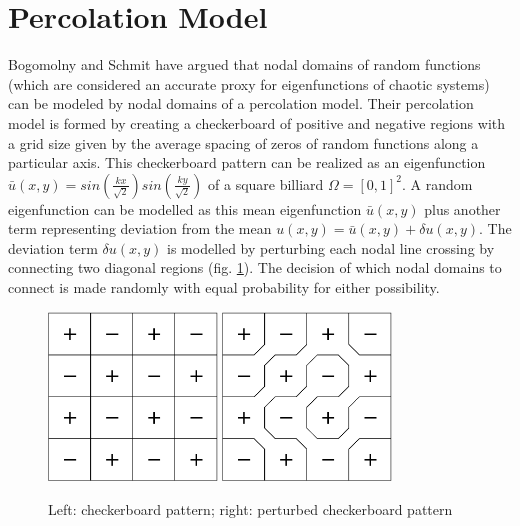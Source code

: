 \documentclass{report}
\begin{document}
\section{Percolation Model}
\label{sec:percolation}
Bogomolny and Schmit \cite{bogomolny} have argued that nodal domains of random functions (which are considered an accurate proxy for eigenfunctions of chaotic systems) can be modeled by nodal domains of a percolation model. Their percolation model is formed by creating a checkerboard of positive and negative regions with a grid size given by the average spacing of zeros of random functions along a particular axis. This checkerboard pattern can be realized as an eigenfunction $\bar{u}(x,y) = sin(\frac{kx}{\sqrt{2}})sin(\frac{ky}{\sqrt{2}})$ of a square billiard $\Omega = [0,1]^{2}$. A random eigenfunction can be modelled as this mean eigenfunction $\bar{u}(x,y)$ plus another term representing deviation from the mean $u(x,y) = \bar u(x,y) + \delta u(x,y)$. The deviation term $\delta u(x,y)$ is modelled by perturbing each nodal line crossing by connecting two diagonal regions (fig. \ref{fig:percolation}). The decision of which nodal domains to connect is made randomly with equal probability for either possibility.

\begin{figure}
  \begin{center}
    \includegraphics[width=0.4\textwidth]{figs/percolation/checkerboard.eps}
    \hspace{1 cm}
    \includegraphics[width=0.4\textwidth]{figs/percolation/perturbed.eps}
    \caption{Left: checkerboard pattern; right: perturbed checkerboard pattern}
    \label{fig:percolation}
  \end{center}
\end{figure}
\end{document}
